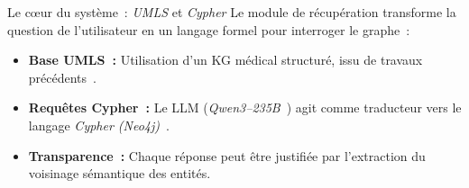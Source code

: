 \begin{frame}{Le c\oe{}ur du système~: \emph{UMLS} et \emph{Cypher}}
  Le module de récupération transforme la question de l'utilisateur
  en un langage formel pour interroger le graphe~:

  \medskip{}

  \pause[]

  \begin{itemize}
    \item<2-> \textbf{Base UMLS~:} Utilisation d'un KG médical structuré, issu
      de travaux précédents~\cite{medeiros2024harnessing}.
    \item<3-> \textbf{Requêtes Cypher~:} Le LLM
      (\emph{Qwen3--235B}~\cite{yang2025qwen3technicalreport}) agit comme
      traducteur vers le langage
      \emph{Cypher (Neo4j)}~\cite{neo4j2025overview}.
    \item<4-> \textbf{Transparence~:} Chaque réponse peut être justifiée par
      l'extraction du voisinage sémantique des entités.
  \end{itemize}
\end{frame}

